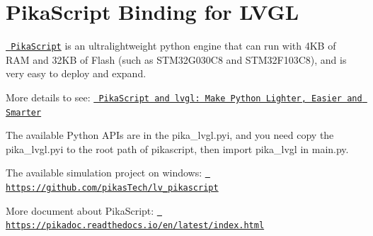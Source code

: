\chapter{Pika\+Script Binding for LVGL}
\hypertarget{md_managed__components_2lvgl____lvgl_2env__support_2pikascript_2README}{}\label{md_managed__components_2lvgl____lvgl_2env__support_2pikascript_2README}
\label{md_managed__components_2lvgl____lvgl_2env__support_2pikascript_2README_autotoc_md484}%
%
 \href{https://github.com/pikasTech/pikascript}{\texttt{ Pika\+Script}} is an ultralightweight python engine that can run with 4KB of RAM and 32KB of Flash (such as STM32\+G030\+C8 and STM32\+F103\+C8), and is very easy to deploy and expand.

More details to see\+: \href{https://blog.lvgl.io/2022-08-24/pikascript-and-lvgl}{\texttt{ Pika\+Script and lvgl\+: Make Python Lighter, Easier and Smarter}}

The available Python APIs are in the {\ttfamily pika\+\_\+lvgl.\+pyi}, and you need copy the {\ttfamily pika\+\_\+lvgl.\+pyi} to the root path of pikascript, then {\ttfamily import pika\+\_\+lvgl} in {\ttfamily main.\+py}.

The available simulation project on windows\+: \href{https://github.com/pikasTech/lv_pikascript}{\texttt{ https\+://github.\+com/pikas\+Tech/lv\+\_\+pikascript}}

More document about Pika\+Script\+: \href{https://pikadoc.readthedocs.io/en/latest/index.html}{\texttt{ https\+://pikadoc.\+readthedocs.\+io/en/latest/index.\+html}} 